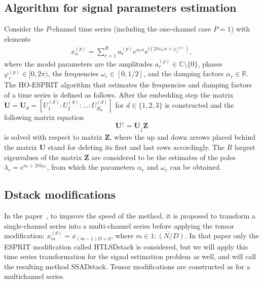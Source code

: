 \documentclass[12pt]{article}
\newcommand{\iu}{\mathrm{i}}
\theoremstyle{definition}
\begin{document}
\subsection{Algorithm for signal parameters estimation}
Consider the $P$-channel time series (including the one-channel case $P=1$) with elements
\begin{gather*}
  x_n^{(p)}= \sum_{r=1}^{R} a_r^{(p)} e^{\alpha_r n} e^{\iu\left(2\pi
  \omega_r n + \varphi_r^{(p)}\right)},
\end{gather*}
where the model parameters are the amplitudes $a_r^{(p)} \in
\mathbb{C}\setminus\{0\}$, phases ${\varphi_r^{(p)} \in [0, 2\pi)}$,
the frequencies $\omega_r\in [0, 1/2]$, and the damping factors $\alpha_r \in
\mathbb{R}$. The HO-ESPRIT algorithm that estimates the frequencies
and damping factors of a time series is defined as follows.
After the embedding step the matrix $\mathbf{U} = \mathbf{U}_d =
\left[U_1^{(d)} :
U_2^{(d)}:\ldots : U_{R_d}^{(d)}\right]$ for $d\in \{1, 2,
3\}$ is constructed and the following matrix equation
\begin{equation*}
  \mathbf{U}^{\uparrow}=\mathbf{U}_{\downarrow}\mathbf{Z}
\end{equation*}
is solved with respect to matrix $\mathbf{Z}$, where the up and down
arrows placed
behind the matrix $\mathbf{U}$ stand for deleting its first and last
rows accordingly.
The $R$ largest eigenvalues of the matrix $\mathbf{Z}$ are considered
to be the estimates of the poles $\lambda_r = e^{\alpha_r + 2\pi\iu
\omega_r}$, from which the parameters $\alpha_r$ and $\omega_r$ can be obtained.

\subsection{Dstack modifications}
In the paper~\cite{Papy2009}, to improve the speed of the method, it
is proposed to transform a single-channel series into a multi-channel
series before applying the tensor modification: $x_m^{(d)} =
x_{(m-1)D + d}$, where $m \in \overline{1:(N/D)}$. In that paper only
the ESPRIT modification called HTLSDstack is considered, but we will
apply this time series transformation for the signal estimation
problem as well, and will call the resulting method SSADstack.
Tensor modifications are constructed as for a multichannel series.
\end{document}
